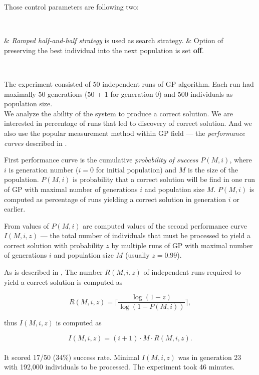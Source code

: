 \documentclass[12pt,a4paper]{report}
\newenvironment{enum}
{\begin{easylist}[itemize]}
{\end{easylist}}
\begin{document}
Those control parameters are following two:

~\begin{enum}
 & \textit{Ramped half-and-half strategy} is used as search strategy.
 & Option of preserving the best individual into the next population is set \textbf{off}.
\end{enum}~

The experiment consisted of 50 independent runs of GP algorithm.
Each run had maximally 50 generations (50 + 1 for generation 0)
and 500 individuals as population size.\\

We analyze the ability of the system to produce a correct solution.
We are interested in percentage of runs that led to discovery of
correct solution. And we also use the popular measurement  
method within GP field --- the \textit{performance curves}
described in \cite{koza92}.

First performance curve is the cumulative \textit{probability of success}
$P(M,i)$, where $i$ is generation number ($i = 0$ for initial population) 
and $M$ is the size of the population. 
$P(M,i)$ is probability that a correct solution will
be find in one run of GP with maximal number of generations $i$ and 
population size $M$. $P(M,i)$ is computed as percentage of 
runs yielding a correct solution in generation $i$ or earlier.

From values of $P(M,i)$ are computed values of the second performance curve
$I(M,i,z)$
--- the total number of individuals that must be processed to yield a correct
solution with probability $z$ by multiple runs of GP with maximal 
number of generations $i$ and population size $M$ (usually $z = 0.99$).

As is described in \cite{koza92},
The number $R(M,i,z)$ of independent runs required to yield a correct solution 
is computed as
 
$$ R(M,i,z) = \lceil\frac{\log(1-z)}{\log(1-P(M,i))}\rceil ,$$

thus $I(M,i,z)$ is computed as

$$I(M,i,z) = (i+1) \cdot M \cdot R(M,i,z) .$$\\

It scored 17/50 (34\%) success rate. 
Minimal $I(M,i,z)$ was in generation 23 
with 192,000 individuals to be processed.
The experiment took 46 minutes.\\

\end{document}
